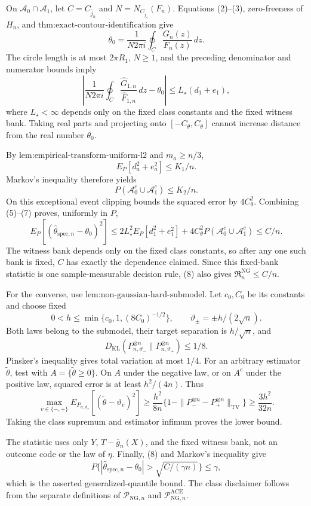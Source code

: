 On \(\mathcal A_0\cap\mathcal A_1\), let \(C=C_{\widehat j_n}\) and \(N=N_{C_{\widehat j_n}}(F_n)\).  Equations (2)--(3), zero-freeness of \(H_n\), and \(\text{thm:exact-contour-identification}\) give
\[
 \theta_0=\frac{1}{N2\pi i}\oint_C\frac{G_n(z)}{F_n(z)}\,dz.
\]
The circle length is at most \(2\pi R_1\), \(N\ge1\), and the preceding denominator and numerator bounds imply
\[
 \left|\frac{1}{N2\pi i}\oint_C
 \frac{\widehat G_{1,n}}{\widehat F_{1,n}}\,dz-\theta_0\right|
 \le L_\star(d_1+e_1), \tag{5}
\]
where \(L_\star<\infty\) depends only on the fixed class constants and the fixed witness bank.  Taking real parts and projecting onto \([-C_\theta,C_\theta]\) cannot increase distance from the real number \(\theta_0\).

By \(\text{lem:empirical-transform-uniform-l2}\) and \(m_a\ge n/3\),
\[
 E_P[d_a^2+e_a^2]\le K_1/n. \tag{6}
\]
Markov's inequality therefore yields
\[
 P(\mathcal A_0^c\cup\mathcal A_1^c)\le K_2/n. \tag{7}
\]
On this exceptional event clipping bounds the squared error by \(4C_\theta^2\).  Combining (5)--(7) proves, uniformly in \(P\),
\[
 E_P[(\widehat\theta_{\mathrm{spec},n}-\theta_0)^2]
 \le2L_\star^2E_P[d_1^2+e_1^2]
 +4C_\theta^2P(\mathcal A_0^c\cup\mathcal A_1^c)
 \le C/n. \tag{8}
\]
The witness bank depends only on the fixed class constants, so after any one such bank is fixed, \(C\) has exactly the dependence claimed.  Since this fixed-bank statistic is one sample-measurable decision rule, (8) also gives \(\mathfrak R_n^{\mathrm{NG}}\le C/n\).

For the converse, use \(\text{lem:non-gaussian-hard-submodel}\).  Let \(c_0,C_0\) be its constants and choose fixed
\[
 0<h\le\min\{c_0,1,(8C_0)^{-1/2}\},
 \qquad \vartheta_\pm=\pm h/(2\sqrt n).
\]
Both laws belong to the submodel, their target separation is \(h/\sqrt n\), and
\[
 D_{\mathrm{KL}}(P_{n,\vartheta_-}^{\otimes n}\|P_{n,\vartheta_+}^{\otimes n})\le1/8.
\]
Pinsker's inequality gives total variation at most \(1/4\).  For an arbitrary estimator \(\widetilde\theta\), test with \(A=\{\widetilde\theta\ge0\}\).  On \(A\) under the negative law, or on \(A^c\) under the positive law, squared error is at least \(h^2/(4n)\).  Thus
\[
 \max_{v\in\{-,+\}}E_{P_{n,\vartheta_v}}[(\widetilde\theta-\vartheta_v)^2]
 \ge \frac{h^2}{8n}\{1-\|P_-^{\otimes n}-P_+^{\otimes n}\|_{\mathrm{TV}}\}
 \ge\frac{3h^2}{32n}.
\]
Taking the class supremum and estimator infimum proves the lower bound.

The statistic uses only \(Y\), \(T-\bar g_n(X)\), and the fixed witness bank, not an outcome code or the law of \(\eta\).  Finally, (8) and Markov's inequality give
\[
 P\{|\widehat\theta_{\mathrm{spec},n}-\theta_0|>\sqrt{C/(\gamma n)}\}\le\gamma,
\]
which is the asserted generalized-quantile bound.  The class disclaimer follows from the separate definitions of \(\mathcal P_{\mathrm{NG},n}\) and \(\mathcal P_{\mathrm{NG},n}^{\mathrm{ACE}}\).
